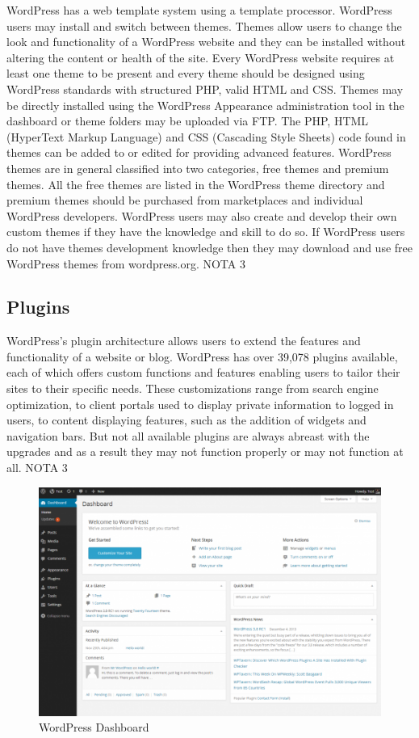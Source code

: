 WordPress has a web template system using a template processor.
WordPress users may install and switch between themes. Themes allow users to change the look and functionality of a WordPress website and they can be installed without altering the content or health of the site. Every WordPress website requires at least one theme to be present and every theme should be designed using WordPress standards with structured PHP, valid HTML and CSS. Themes may be directly installed using the WordPress Appearance administration tool in the dashboard or theme folders may be uploaded via FTP. The PHP, HTML (HyperText Markup Language) and CSS (Cascading Style Sheets) code found in themes can be added to or edited for providing advanced features. WordPress themes are in general classified into two categories, free themes and premium themes. All the free themes are listed in the WordPress theme directory and premium themes should be purchased from marketplaces and individual WordPress developers. WordPress users may also create and develop their own custom themes if they have the knowledge and skill to do so. If WordPress users do not have themes development knowledge then they may download and use free WordPress themes from wordpress.org. NOTA 3

\subsection{Plugins}
\label{subsec:wp_plugins}


WordPress's plugin architecture allows users to extend the features and functionality of a website or blog. WordPress has over 39,078 plugins available, each of which offers custom functions and features enabling users to tailor their sites to their specific needs. These customizations range from search engine optimization, to client portals used to display private information to logged in users, to content displaying features, such as the addition of widgets and navigation bars. But not all available plugins are always abreast with the upgrades and as a result they may not function properly or may not function at all. NOTA 3



\begin {figure}[h]
\graphicspath{{images/chapter_cms/}}
\includegraphics[width=\textwidth]{wp_dash}
\caption{WordPress Dashboard}
\end {figure}
